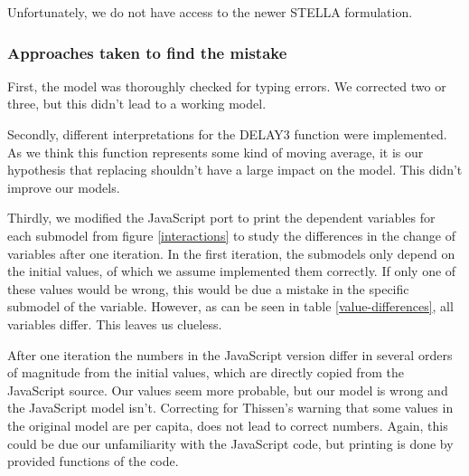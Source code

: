 \documentclass[10pt,a4paper]{scrartcl}
\begin{document}
Unfortunately, we do not have access to the newer STELLA formulation.

\subsubsection*{Approaches taken to find the mistake}

First, the model was thoroughly checked for typing errors. We corrected two or three, but this didn't lead to a working model.

Secondly, different interpretations for the DELAY3 function were implemented. As we think this function represents some kind of moving average, it is our hypothesis that replacing shouldn't have a large impact on the model. This didn't improve our models.

Thirdly, we modified the JavaScript port \cite{blogpost} to print the dependent variables for each submodel from figure \ref{interactions} to study the differences in the change of variables after one iteration. In the first iteration, the submodels only depend on the initial values, of which we assume implemented them correctly. If only one of these values would be wrong, this would be due a mistake in the specific submodel of the variable. However, as can be seen in table \ref{value-differences}, all variables differ. This leaves us clueless.

After one iteration the numbers in the JavaScript version differ in several orders of magnitude from the initial values, which are directly copied from the JavaScript source. Our values seem more probable, but our model is wrong and the JavaScript model isn't. Correcting for Thissen's warning that some values in the original model are per capita, does not lead to correct numbers. Again, this could be due our unfamiliarity with the JavaScript code, but printing is done by provided functions of the code.
\end{document}
